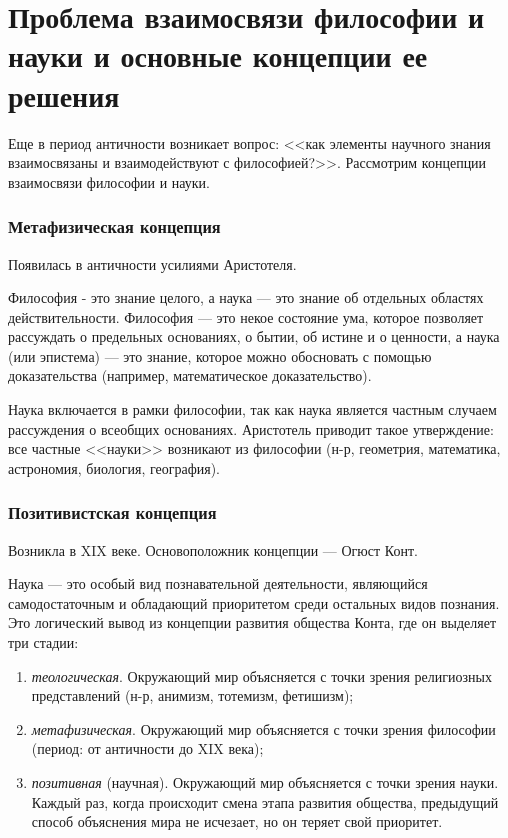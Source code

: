 	\section {Проблема взаимосвязи философии и науки и основные концепции ее решения}

Еще в период античности возникает вопрос: <<как элементы научного знания взаимосвязаны и взаимодействуют с философией?>>. Рассмотрим концепции взаимосвязи философии и науки.

\subsubsection{Метафизическая концепция}

Появилась в античности усилиями Аристотеля.

Философия - это знание целого, а наука — это знание об отдельных областях действительности.
Философия — это некое состояние ума, которое позволяет рассуждать о предельных основаниях, о бытии, об истине и о ценности, а наука (или эпистема) — это знание, которое можно обосновать с помощью доказательства (например, математическое доказательство). 

Наука включается в рамки философии, так как наука является частным случаем рассуждения о всеобщих основаниях.
Аристотель приводит такое утверждение: все частные <<науки>> возникают из философии (н-р, геометрия, математика, астрономия, биология, география).

\subsubsection{Позитивистская концепция}

Возникла в XIX веке. Основоположник концепции — Огюст Конт. 

Наука — это особый вид познавательной деятельности, являющийся самодостаточным и обладающий приоритетом среди остальных видов познания. 
Это логический вывод из концепции развития общества Конта, где он выделяет три стадии: 
\begin{enumerate}
    \item \textit{теологическая}. Окружающий мир объясняется с точки зрения религиозных представлений (н-р, анимизм, тотемизм, фетишизм);
    \item \textit{метафизическая}. Окружающий мир объясняется с точки зрения философии (период: от античности до XIX века);
    \item \textit{позитивная} (научная). Окружающий мир объясняется с точки зрения науки.
Каждый раз, когда происходит смена этапа развития общества, предыдущий способ объяснения мира не исчезает, но он теряет свой приоритет.
\end{enumerate}

